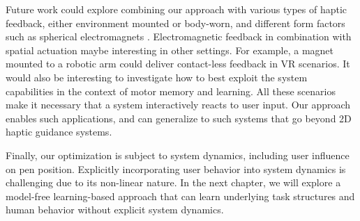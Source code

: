 Future work could explore combining our approach with various types of haptic feedback, either environment mounted or body-worn, and different form factors such as spherical electromagnets \cite{Langerak:2020:Omni, zarate2020contact}. 
Electromagnetic feedback in combination with spatial actuation maybe interesting in other settings. 
For example, a magnet mounted to a robotic arm could deliver contact-less feedback in VR scenarios. 
It would also be interesting to investigate how to best exploit the system capabilities in the context of motor memory and learning.
All these scenarios make it necessary that a system interactively reacts to user input.
Our approach enables such applications, and can generalize to such systems that go beyond 2D haptic guidance systems.

Finally, our optimization is subject to system dynamics, including user influence on pen position. Explicitly incorporating user behavior into system dynamics is challenging due to its non-linear nature. In the next chapter, we will explore a model-free learning-based approach that can learn underlying task structures and human behavior without explicit system dynamics.


